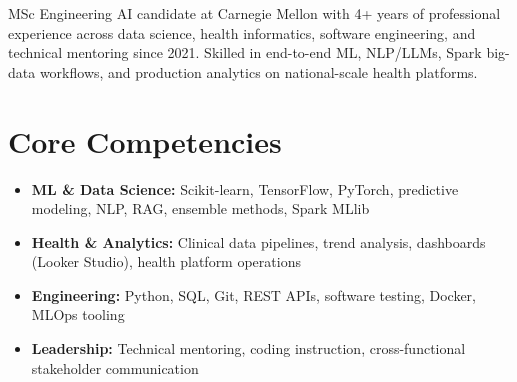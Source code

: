 \documentclass[11pt,a4paper,sans]{moderncv}
\begin{document}
\makecvtitle

\vspace{4pt}
\small{MSc Engineering AI candidate at Carnegie Mellon with 4+ years of professional experience across data science, health informatics, software engineering, and technical mentoring since 2021. Skilled in end-to-end ML, NLP/LLMs, Spark big-data workflows, and production analytics on national-scale health platforms.}

\section{Core Competencies}
\vspace{1pt}
\begin{itemize}
\item \textbf{ML \& Data Science:} Scikit-learn, TensorFlow, PyTorch, predictive modeling, NLP, RAG, ensemble methods, Spark MLlib
\item \textbf{Health \& Analytics:} Clinical data pipelines, trend analysis, dashboards (Looker Studio), health platform operations
\item \textbf{Engineering:} Python, SQL, Git, REST APIs, software testing, Docker, MLOps tooling
\item \textbf{Leadership:} Technical mentoring, coding instruction, cross-functional stakeholder communication
\end{itemize}
\end{document}
